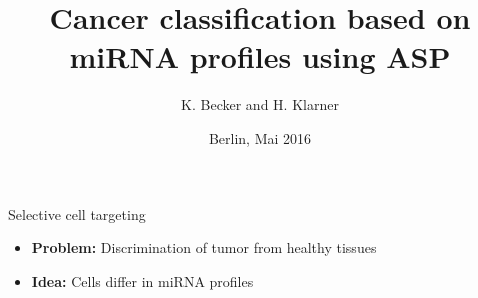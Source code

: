 \documentclass[10pt,dvipsnames]{beamer}
\title{Cancer classification based on miRNA profiles using ASP}
\author{K. Becker and H. Klarner}
\date{Berlin, Mai 2016}
\institute{
Freie Universität Berlin, Germany
}
\begin{document}
\frame{\titlepage}




\begin{frame}{Selective cell targeting}
\large
\begin{itemize}
\item \textbf{Problem:} Discrimination of tumor from healthy tissues
\end{itemize}

\vspace{0.5cm}
\begin{center}
\end{center}
\vspace{0.5cm}

\begin{itemize}
\item<2> \textbf{Idea:} Cells differ in miRNA profiles
\end{itemize}
\end{frame}
\end{document}
